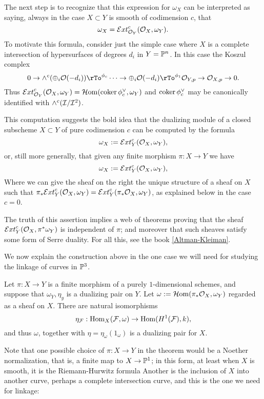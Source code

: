 The next step is to recognize that this expression for $\omega_X$ can be interpreted as saying, always in the case $X\subset Y$ is smooth of
codimension $c$, that
$$
\omega_{X} = \sExt^{c}_{\cO_{Y}}(\cO_{X}, \omega_{Y}).
$$
To motivate this formula, consider just the simple case where $X$ is a complete intersection of hypersurfaces
of degrees $d_{i}$ in $Y = \PP^{n}$. In this case the Koszul complex
$$
0\to \wedge^{c} (\oplus_{i}\cO(-d_{i})) \rTo^{\phi_{c}} \cdots \to \oplus_{i}\cO(-d_{i}) \rTo^{\phi_{1}}\cO_{Y,p} \to\cO_{X,p} \to 0.
$$
Thus $\sExt^{c}_{\cO_{Y}}(\cO_{X}, \omega_{Y}) = \sHom(\coker \phi_{c}^{\vee}, \omega_{Y})$
and $\coker \phi_{c}^{\vee}$ may be canonically identified with $\wedge^{c}(\cI/\cI^{2})$.

This computation suggests the bold idea that the dualizing module of a closed subscheme
$X\subset Y$ of pure codimension $c$ can be computed by the formula
$$
\omega_{X} : = \sExt_{Y}^{c}(\cO_{X}, \omega_{Y}),
$$
or, still more generally, that given any finite morphism $\pi: X\to Y$ we have
$$
\omega_{X} : = \sExt_{Y}^{c}(\cO_{X}, \omega_{Y}),
$$
Where we can give the sheaf on the right the unique structure of a sheaf on $X$
such that $\pi_{*}\sExt_{Y}^{c}(\cO_{X}, \omega_{Y}) = \sExt_{Y}^{c}(\pi_{*}\cO_{X}, \omega_{Y})$, as explained below in the case $c=0$.

The truth of this assertion implies a web of theorems proving that the sheaf 
$\sExt_{Y}^{c}(\cO_{X}, \pi^{*}\omega_{Y})$ is independent of $\pi$; and moreover that such sheaves satisfy some form of Serre duality. For all this, see the book
\ref{Altman-Kleiman}.

We now explain the construction above in the one case we will need for studying the linkage of curves in $\PP^{3}$.


\begin{theorem}\label{construction of omega}
Let $\pi: X \to Y$ is a finite morphism of a purely $1$-dimensional schemes, and suppose that
$\omega_{Y}, \eta_{y}$ is a dualizing pair on $Y$. 
Let $\omega := \sHom(\pi_{*}\cO_{X}, \omega_{Y})$ regarded as a sheaf on $X$. There are
natural isomorphisms 
$$
\eta_{\sF}: \Hom_{X}(\sF, \omega) \to \Hom(H^{1}(\sF), k),
$$
and thus $\omega$, together with $\eta = \eta_{\omega}(1_{\omega})$ is a dualizing pair for $X$.
\end{theorem}

Note that one possible choice of $\pi: X\to Y$ in the theorem would be a Noether normalization, that is, a finite map to $X \to \PP^{1}$; in this form, at least when $X$ is smooth, it is the Riemann-Hurwitz formula  Another is the inclusion of $X$ into another curve, perhaps a complete intersection curve, and this is the one we need for linkage:

